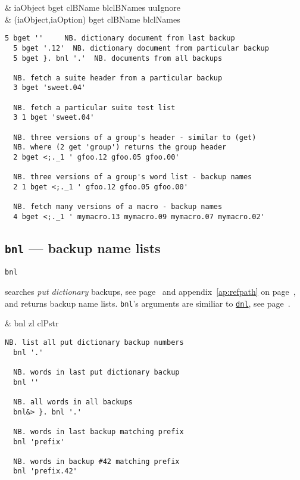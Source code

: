\begin{wordhead}
\dyad & iaObject bget clBName \argsep blclBNames \argsep uuIgnore \\
      & (iaObject,iaOption) bget clBName \argsep blclNames \\
\end{wordhead}
\begin{lstlisting}[frame=single,framerule=0pt]
  5 bget ''     NB. dictionary document from last backup
  5 bget '.12'  NB. dictionary document from particular backup
  5 bget }. bnl '.'  NB. documents from all backups

  NB. fetch a suite header from a particular backup
  3 bget 'sweet.04'
  
  NB. fetch a particular suite test list 
  3 1 bget 'sweet.04'

  NB. three versions of a group's header - similar to (get) 
  NB. where (2 get 'group') returns the group header
  2 bget <;._1 ' gfoo.12 gfoo.05 gfoo.00'  
 
  NB. three versions of a group's word list - backup names
  2 1 bget <;._1 ' gfoo.12 gfoo.05 gfoo.00'  
  
  NB. fetch many versions of a macro - backup names
  4 bget <;._1 ' mymacro.13 mymacro.09 mymacro.07 mymacro.02'   
\end{lstlisting}

\subsection{\texttt{bnl} --- backup name lists}\label{ss:bnl}

  \hypertarget{il:bnl}{\texttt{bnl}} searches \emph{put dictionary} backups, 
  see page~\pageref{xr:putdic} and appendix~\ref{ap:refpath} on page~\pageref{ap:refpath}, and returns backup name lists. 
  \texttt{bnl}'s arguments are similiar to \hyperlink{il:dnl}{\texttt{dnl}}, see page~\pageref{ss:dnl}.
  
  \begin{wordhead}
\monad & bnl zl \argsep clPstr \\
\end{wordhead}
\begin{lstlisting}[frame=single,framerule=0pt]
  NB. list all put dictionary backup numbers
  bnl '.'
  
  NB. words in last put dictionary backup
  bnl ''
  
  NB. all words in all backups
  bnl&> }. bnl '.'
 
  NB. words in last backup matching prefix 
  bnl 'prefix'
  
  NB. words in backup #42 matching prefix
  bnl 'prefix.42'
\end{lstlisting}


